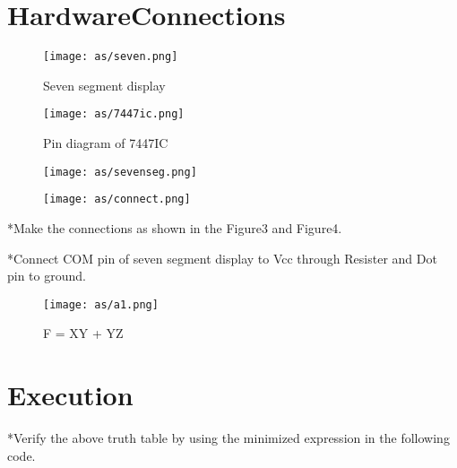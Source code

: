 \documentclass[10pt, a4paper]{article}
\begin{document}
\section{HardwareConnections}
\begin{figure}
    \centering
    \texttt{[image: as/seven.png]}
    \caption{Seven segment display}
    \label{fig:my_label}
\end{figure}
\begin{figure}
    \centering
    \texttt{[image: as/7447ic.png]}
    \caption{Pin diagram of 7447IC}
    \label{fig:my_label}
\end{figure}
\begin{figure}
    \centering
    \texttt{[image: as/sevenseg.png]}
    \caption{}
    \label{fig:my_label}
\end{figure}
\begin{figure}
    \centering
    \texttt{[image: as/connect.png]}
    \caption{}
    \label{fig:my_label}
\end{figure}

*Make the connections as shown in the Figure3 and Figure4.

*Connect COM pin of seven segment display to Vcc through Resister and Dot pin to ground.

\begin{figure}
    \centering
    \texttt{[image: as/a1.png]}
    \caption{F = XY + YZ}
    \label{fig:my_label}
\end{figure}
\section{Execution}
*Verify the above truth table by using the minimized expression in the following code.


\end{document}
